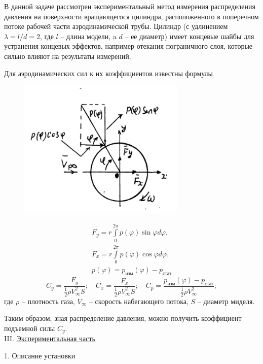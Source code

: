 \documentclass[specialist, subf, href, colorlinks=true, 14pt, final]{disser}
\theoremstyle{definition}
\newcommand{\npart}[2]{\noindent #1. \underline{#2}}
\begin{document}
В данной задаче рассмотрен экспериментальный метод измерения распределения давления на поверхности вращающегося цилиндра, расположенного в поперечном потоке рабочей части аэродинамической трубы. Цилиндр (с удлинением $\lambda = l/d = 2$, где $l$ -- длина модели, a $d$ -- ее диаметр) имеет концевые шайбы для устранения концевых эффектов, например отекания пограничного слоя, которые сильно влияют на результаты измерений. 

Для аэродинамических сил к их коэффициентов известны формулы
\begin{figure} 
  \includegraphics[width=80mm]{pics/2-8-3.png}
  \caption{}
  \label{2-8-3}
\end{figure}
{\large
\[
\begin{array}{l}
  F_y = r \int \limits_0^{2\pi} p(\varphi) \sin \varphi d\varphi,\\
  F_x = r \int \limits_0^{2\pi} p(\varphi) \cos \varphi d\varphi,\\
  p(\varphi) = p_{\text{изм}}(\varphi) - p_{\text{стат}}
\end{array}
\]
}
\vspace{3cm}
\[ 
  C_y = \frac{F_y}{\frac{1}{2} \rho V^2_{\infty} S}; \quad C_x = \frac{F_x}{\frac{1}{2} \rho V^2_{\infty} S}; \quad C_p = \frac{ p_{\text{изм}}(\varphi) - p_{\text{стат}} }{\frac{1}{2} \rho V^2_{\infty}};
\]
где $\rho$ -- плотность газа, $V_{\infty}$ -- скорость набегающего потока, $S$ -- диаметр миделя.

Таким образом, зная распределение давления, можно получить коэффициент подъемной силы $C_y$.\\

\npart{III}{Экспериментальная часть}

1. Описание установки
\end{document}
